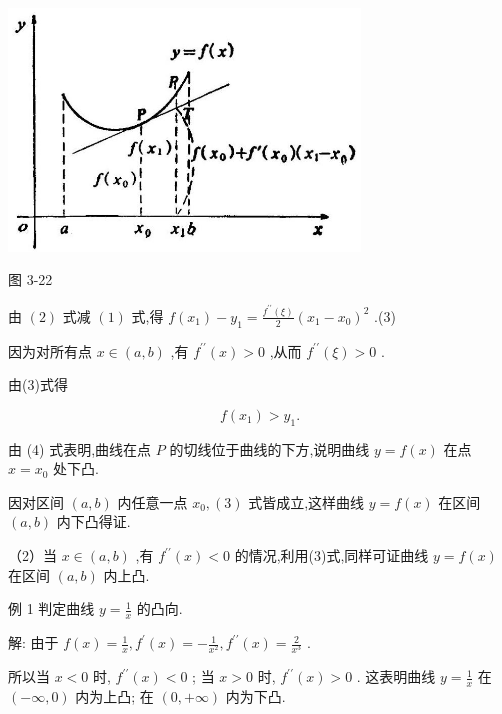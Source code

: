 \documentclass[lang=cn,newtx,10pt,scheme=chinese]{elegantbook}
\begin{document}
\begin{center}
\includegraphics[max width=0.7\textwidth]{images/01912c18-5c3f-733d-b775-749ba9897a9d_167_239614.jpg}
\end{center}

图 3-22

由 \(\left( 2\right)\) 式减 \(\left( 1\right)\) 式,得 \(f\left( {x}_{1}\right) - {y}_{1} = \frac{{f}^{\prime \prime }\left( \xi \right) }{2}{\left( {x}_{1} - {x}_{0}\right) }^{2}\) .(3)

因为对所有点 \(x \in \left( {a,b}\right)\) ,有 \({f}^{\prime \prime }\left( x\right) > 0\) ,从而 \({f}^{\prime \prime }\left( \xi \right) > 0\) .

由(3)式得

\[
f\left( {x}_{1}\right) > {y}_{1}\text{.} \tag{4}
\]

由 (4) 式表明,曲线在点 \(P\) 的切线位于曲线的下方,说明曲线 \(y = f\left( x\right)\) 在点 \(x = {x}_{0}\) 处下凸.

因对区间 \(\left( {a,b}\right)\) 内任意一点 \({x}_{0},\left( 3\right)\) 式皆成立,这样曲线 \(y = f\left( x\right)\) 在区间 \(\left( {a,b}\right)\) 内下凸得证.

（2）当 \(x \in \left( {a,b}\right)\) ,有 \({f}^{\prime \prime }\left( x\right) < 0\) 的情况,利用(3)式,同样可证曲线 \(y = f\left( x\right)\) 在区间 \(\left( {a,b}\right)\) 内上凸.

例 1 判定曲线 \(y = \frac{1}{x}\) 的凸向.

解: 由于 \(f\left( x\right) = \frac{1}{x},{f}^{\prime }\left( x\right) = - \frac{1}{{x}^{2}},{f}^{\prime \prime }\left( x\right) = \frac{2}{{x}^{3}}\) .

所以当 \(x < 0\) 时, \({f}^{\prime \prime }\left( x\right) < 0\) ; 当 \(x > 0\) 时, \({f}^{\prime \prime }\left( x\right) > 0\) . 这表明曲线 \(y = \frac{1}{x}\) 在 \(\left( {-\infty ,0}\right)\) 内为上凸; 在 \(\left( {0, + \infty }\right)\) 内为下凸.
\end{document}
